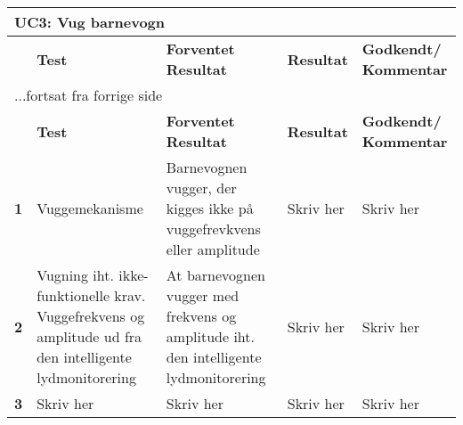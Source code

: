 \begin{center}
	\label{accepttest:uc3} 
\begin{longtable}{|p{}|p{}|p{}|p{}|p{}|} %
\hline
\multicolumn{5}{|l|}{\textbf{UC3: Vug barnevogn}} \\ \hline
\multicolumn{1}{|c|}{} &
\textbf{Test} &
\textbf{Forventet \newline Resultat} &
\textbf{Resultat} &
\textbf{Godkendt/ \newline Kommentar} \\ \hline 
\endfirsthead

\multicolumn{5}{l}{...fortsat fra forrige side} \\ \hline 
\multicolumn{1}{|c|}{} &
\textbf{Test} &
\textbf{Forventet \newline Resultat} &
\textbf{Resultat} &
\textbf{Godkendt/ \newline Kommentar} \\ \hline 
\endhead



\textbf{1}	&Vuggemekanisme
			&Barnevognen vugger, der kigges ikke på vuggefrevkvens eller amplitude
			&Skriv her
			&Skriv her 
			\\\hline

\textbf{2}	&Vugning iht. ikke-funktionelle krav. Vuggefrekvens og amplitude ud fra den intelligente lydmonitorering 
			&At barnevognen vugger med frekvens og amplitude iht. den intelligente lydmonitorering 
			&Skriv her
			&Skriv her 
			\\\hline
			 
\textbf{3}	&Skriv her
			&Skriv her
			&Skriv her
			&Skriv her
			\\\hline

\end{longtable}
\end{center}